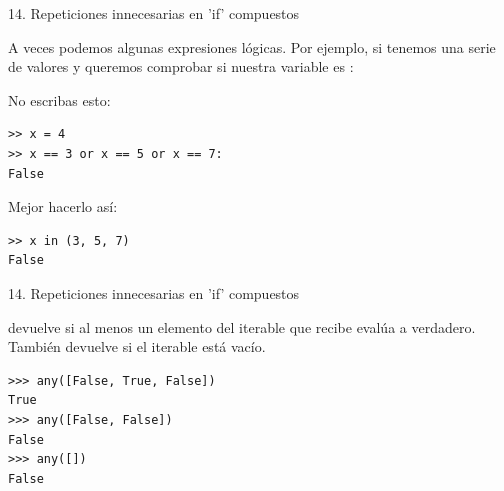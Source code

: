 \documentclass[14pt]{beamer}
\begin{document}
\begin{frame}[fragile]
  {14. \normalsize Repeticiones innecesarias en 'if' compuestos}
  \small
  \begin{block}{}
    \centering
    A veces podemos  algunas expresiones
    lógicas. Por ejemplo, si tenemos una serie de valores y queremos
    comprobar si nuestra variable es :
  \end{block}

  \footnotesize
  \begin{exampleblock}
    {No escribas esto:}
    \begin{lstlisting}
>> x = 4
>> x == 3 or x == 5 or x == 7:
False
    \end{lstlisting}
  \end{exampleblock}

  \begin{exampleblock}
    {Mejor hacerlo así:}
    \begin{lstlisting}
>> x in (3, 5, 7)
False
    \end{lstlisting}
  \end{exampleblock}
\end{frame}

\begin{frame}[fragile]
  {14. \normalsize Repeticiones innecesarias en 'if' compuestos}
  \begin{block}{}
    \centering
     devuelve  si al menos un
    elemento del iterable que recibe evalúa a verdadero. También
    devuelve  si el iterable está vacío.
  \end{block}

  \begin{exampleblock}{}
    \begin{lstlisting}
>>> any([False, True, False])
True
>>> any([False, False])
False
>>> any([])
False
    \end{lstlisting}
  \end{exampleblock}
\end{frame}
\end{document}
